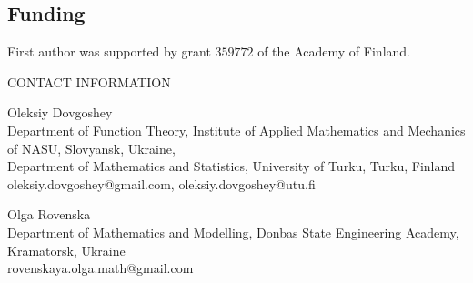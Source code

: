 \documentclass[11pt]{article}
\theoremstyle{definition}
\theoremstyle{remark}
\numberwithin{equation}{section}
\begin{document}
\subsection*{Funding}

First author was supported by grant $359772$ of the Academy of Finland.\\





















\bigskip

CONTACT INFORMATION

\medskip
Oleksiy Dovgoshey\\
Department of Function Theory, Institute of Applied Mathematics and Mechanics of NASU, Slovyansk, Ukraine,\\
Department of Mathematics and Statistics, University of Turku, Turku, Finland \\
oleksiy.dovgoshey@gmail.com, oleksiy.dovgoshey@utu.fi


\medskip
Olga Rovenska\\
Department of Mathematics and Modelling, Donbas State Engineering Academy, Kramatorsk, Ukraine\\
rovenskaya.olga.math@gmail.com
\end{document}
